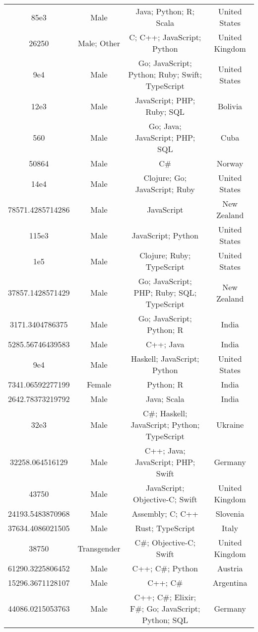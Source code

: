 \begin{center}
\begin{tabular}{ |c|c|c|c| }
85e3  &  Male  &  Java; Python; R; Scala  &  United States  \\ 
26250  &  Male; Other  &  C; C++; JavaScript; Python  &  United Kingdom  \\ 
9e4  &  Male  &  Go; JavaScript; Python; Ruby; Swift; TypeScript  &  United States  \\ 
12e3  &  Male  &  JavaScript; PHP; Ruby; SQL  &  Bolivia  \\ 
560  &  Male  &  Go; Java; JavaScript; PHP; SQL  &  Cuba  \\ 
50864  &  Male  &  C\#  &  Norway  \\ 
14e4  &  Male  &  Clojure; Go; JavaScript; Ruby  &  United States  \\ 
78571.4285714286  &  Male  &  JavaScript  &  New Zealand  \\ 
115e3  &  Male  &  JavaScript; Python  &  United States  \\ 
1e5  &  Male  &  Clojure; Ruby; TypeScript  &  United States  \\ 
37857.1428571429  &  Male  &  Go; JavaScript; PHP; Ruby; SQL; TypeScript  &  New Zealand  \\ 
3171.3404786375  &  Male  &  Go; JavaScript; Python; R  &  India  \\ 
5285.56746439583  &  Male  &  C++; Java  &  India  \\ 
9e4  &  Male  &  Haskell; JavaScript; Python  &  United States  \\ 
7341.06592277199  &  Female  &  Python; R  &  India  \\ 
2642.78373219792  &  Male  &  Java; Scala  &  India  \\ 
32e3  &  Male  &  C\#; Haskell; JavaScript; Python; TypeScript  &  Ukraine  \\ 
32258.064516129  &  Male  &  C++; Java; JavaScript; PHP; Swift  &  Germany  \\ 
43750  &  Male  &  JavaScript; Objective-C; Swift  &  United Kingdom  \\ 
24193.5483870968  &  Male  &  Assembly; C; C++  &  Slovenia  \\ 
37634.4086021505  &  Male  &  Rust; TypeScript  &  Italy  \\ 
38750  &  Transgender  &  C\#; Objective-C; Swift  &  United Kingdom  \\ 
61290.3225806452  &  Male  &  C++; C\#; Python  &  Austria  \\ 
15296.3671128107  &  Male  &  C++; C\#  &  Argentina  \\ 
44086.0215053763  &  Male  &  C++; C\#; Elixir; F\#; Go; JavaScript; Python; SQL  &  Germany  \\ 

\end{tabular}
\end{center}
